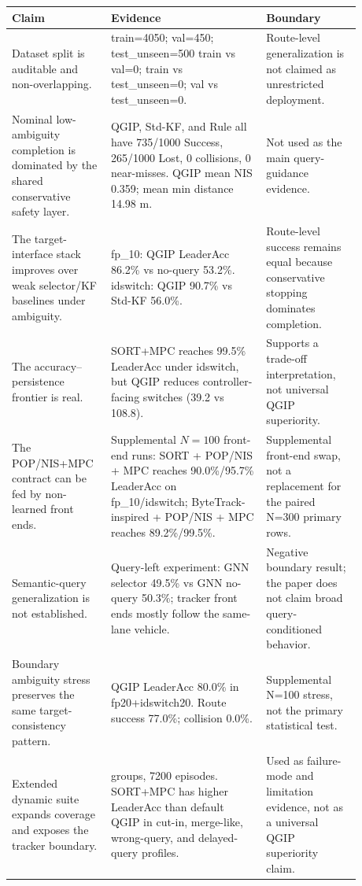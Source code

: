 \begin{tabular}{@{}>{\raggedright\arraybackslash}p{0.22\linewidth} >{\raggedright\arraybackslash}p{0.41\linewidth} >{\raggedright\arraybackslash}p{0.25\linewidth}@{}}
\toprule
\textbf{Claim} & \textbf{Evidence} & \textbf{Boundary} \\
\midrule
Dataset split is auditable and non-overlapping. & train=4050; val=450; test\_unseen=500 train vs val=0; train vs test\_unseen=0; val vs test\_unseen=0. & Route-level generalization is not claimed as unrestricted deployment. \\
Nominal low-ambiguity completion is dominated by the shared conservative safety layer. & QGIP, Std-KF, and Rule all have 735/1000 Success, 265/1000 Lost, 0 collisions, 0 near-misses. QGIP mean NIS 0.359; mean min distance 14.98 m. & Not used as the main query-guidance evidence. \\
The target-interface stack improves over weak selector/KF baselines under ambiguity. & fp\_10: QGIP LeaderAcc 86.2\% vs no-query 53.2\%. idswitch: QGIP 90.7\% vs Std-KF 56.0\%. & Route-level success remains equal because conservative stopping dominates completion. \\
The accuracy--persistence frontier is real. & SORT+MPC reaches 99.5\% LeaderAcc under idswitch, but QGIP reduces controller-facing switches (39.2 vs 108.8). & Supports a trade-off interpretation, not universal QGIP superiority. \\
The POP/NIS+MPC contract can be fed by non-learned front ends. & Supplemental $N=100$ front-end runs: SORT + POP/NIS + MPC reaches 90.0\%/95.7\% LeaderAcc on fp\_10/idswitch; ByteTrack-inspired + POP/NIS + MPC reaches 89.2\%/99.5\%. & Supplemental front-end swap, not a replacement for the paired N=300 primary rows. \\
Semantic-query generalization is not established. & Query-left experiment: GNN selector 49.5\% vs GNN no-query 50.3\%; tracker front ends mostly follow the same-lane vehicle. & Negative boundary result; the paper does not claim broad query-conditioned behavior. \\
Boundary ambiguity stress preserves the same target-consistency pattern. & QGIP LeaderAcc 80.0\% in fp20+idswitch20. Route success 77.0\%; collision 0.0\%. & Supplemental N=100 stress, not the primary statistical test. \\
Extended dynamic suite expands coverage and exposes the tracker boundary. & 28 groups, 7200 episodes. SORT+MPC has higher LeaderAcc than default QGIP in cut-in, merge-like, wrong-query, and delayed-query profiles. & Used as failure-mode and limitation evidence, not as a universal QGIP superiority claim. \\

\end{tabular}
